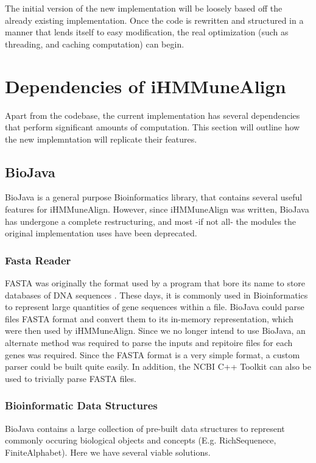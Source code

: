 \documentclass[a4paper,12pt]{report}
\begin{document}
The initial version of the new implementation will be loosely based off the already existing implementation. Once the code is rewritten and structured in a manner that lends itself to easy modification, the real optimization (such as threading, and caching computation) can begin.

\section{Dependencies of iHMMuneAlign}
Apart from the codebase, the current implementation has several dependencies that perform significant amounts of computation. This section will outline how the new implemntation will replicate their features.

\subsection{BioJava}
BioJava \autocite{biojava}is a general purpose Bioinformatics library, that contains several useful features for iHMMuneAlign. However, since iHMMuneAlign was written, BioJava has undergone a complete restructuring, and most -if not all- the modules the original implementation uses have been deprecated.

\subsubsection{Fasta Reader}
FASTA was originally the format used by a program that bore its name to store databases of DNA sequences \autocite{fasta}. These days, it is commonly used in Bioinformatics to represent large quantities of gene sequences within a file. BioJava could parse files FASTA format and convert them to its in-memory representation, which were then used by iHMMuneAlign. Since we no longer intend to use BioJava, an alternate method was required to parse the inputs and repitoire files for each genes was required. Since the FASTA format is a very simple format, a custom parser could be built quite easily. In addition, the NCBI C++ Toolkit \autocite{ncbi-fasta} can also be used to trivially parse FASTA files.

\subsubsection{Bioinformatic Data Structures}
BioJava contains a large collection of pre-built data structures to represent commonly occuring biological objects and concepts (E.g. RichSequenece, FiniteAlphabet). Here we have several viable solutions.
\end{document}
